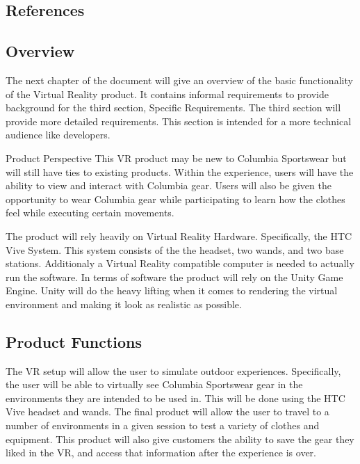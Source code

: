 \documentclass[10pt,journal,compsoc,onecolumn, draftclsnofoot]{IEEEtran}
\begin{document}
\subsection{References}
\begingroup
\renewcommand{\section}[2]{}%


\endgroup

\subsection{Overview}
The next chapter of the document will give an overview of the basic functionality
of the Virtual Reality product. It contains informal requirements to provide
background for the third section, Specific Requirements. The third section
will provide more detailed requirements. This section is intended for a more
technical audience like developers.

\section{Overall Description}
\subsection{Product Perspective}
This VR product may be new to Columbia Sportswear but will still have ties to
existing products. Within the experience, users will have the ability to view
and interact with Columbia gear. Users will also be given the opportunity to
wear Columbia gear while participating to learn how the clothes feel while
executing certain movements.

The product will rely heavily on Virtual Reality Hardware.
Specifically, the HTC Vive System. This system consists of the the headset, two
wands, and two base stations. Additionaly a Virtual Reality compatible computer is needed to actually run the software. In terms of software the
product will rely on the Unity Game Engine. Unity will do the heavy lifting
when it comes to rendering the virtual environment and making it look as realistic as possible.

\subsection{Product Functions}
The VR setup will allow the user to simulate outdoor experiences.
Specifically, the user will be able to virtually see Columbia Sportswear
gear in the environments they are intended to be used in.
This will be done using the HTC Vive headset and wands. The final product
will allow the user to travel to a number of environments in a given session to
test a variety of clothes and equipment. This product will also give customers
the ability to save the gear they liked in the VR, and access that information after the experience is over.
\end{document}
